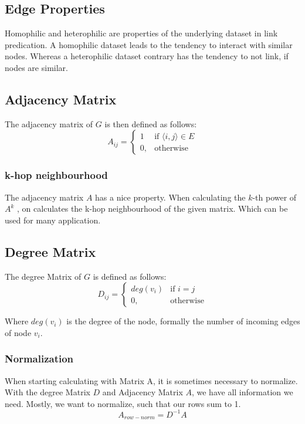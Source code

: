 \subsection{Edge Properties}
Homophilic and heterophilic are properties of the underlying dataset in link predication. 
A homophilic dataset leads to the tendency to interact with similar nodes. Whereas a heterophilic dataset contrary has the tendency to 
not link, if nodes are similar.

\subsection{Adjacency Matrix}

The adjacency matrix of $G$ is then defined as follows:
\begin{equation}
    A_{ij} =    
    \begin{cases}
        1  & \text{if } \langle i , j \rangle \in E \\
        0, & \text{otherwise}
    \end{cases}
\end{equation}

\subsubsection{k-hop neighbourhood}
The adjacency matrix $A$ has a nice property. When calculating the $k$-th power of $A^k$ , on calculates the k-hop neighbourhood
of the given matrix. Which can be used for many application.

\subsection{Degree Matrix}
The degree Matrix of $G$ is defined as follows:
\begin{equation}
    D_{ij} =    
    \begin{cases}
        deg(v_i)  & \text{if } i = j \\
        0, & \text{otherwise}
    \end{cases}
\end{equation}

Where $deg(v_i)$ is the degree of the node, formally the number of incoming edges of node $v_i$.

\subsubsection{Normalization}
When starting calculating with Matrix A, it is sometimes necessary to normalize.
With the degree Matrix $D$ and Adjacency Matrix $A$, we have all information we need.
Mostly, we want to normalize, such that our rows sum to 1.
\begin{equation}
    A_{row-norm} = D^{-1} A
\end{equation}

